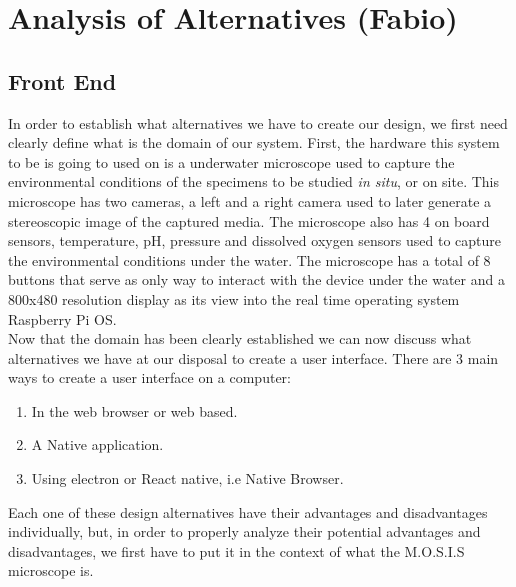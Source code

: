 \section{Analysis of Alternatives (Fabio)}
\subsection{Front End}
In order to establish what alternatives we have to create our design, we first need clearly define what is the domain of our system. First, the hardware this system to be is going to used on is a underwater microscope used to capture the environmental conditions of the specimens to be studied \textit{in situ}, or on site. This microscope has two cameras, a left and a right camera used to later generate a stereoscopic image of the captured media. The microscope also has 4 on board sensors, temperature, pH, pressure and dissolved oxygen sensors used to capture the environmental conditions under the water. The microscope has a total of 8 buttons that serve as only way to interact with the device under the water and a 800x480 resolution display as its view into the real time operating system Raspberry Pi OS.\\
Now that the domain has been clearly established we can now discuss what alternatives we have at our disposal to create a user interface. There are 3 main ways to create a user interface on a computer:
\begin{enumerate}
	\item In the web browser or web based.
	\item A Native application.
	\item Using electron or React native, i.e Native Browser.
\end{enumerate}
Each one of these design alternatives have their advantages and disadvantages individually, but, in order to properly analyze their potential advantages and disadvantages, we first have to put it in the context of what the M.O.S.I.S microscope is.\\
